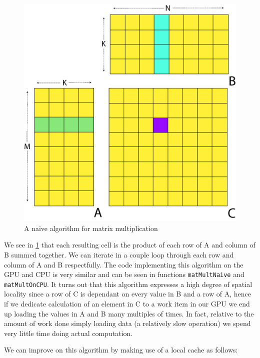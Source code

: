 \documentclass[conc-doc]{subfiles}
\begin{document}
\begin{figure}[H]
	\centerline{\includegraphics[width=\textwidth]{images/gpu-matmult1.png}}
	\caption{A naive algorithm for matrix multiplication}
	\label{fig:matmult1}
\end{figure}

We see in \ref{fig:matmult1} that each resulting cell is the product of each row of A and column of B summed together. We can iterate in a couple loop through each row and column of A and B respectfully. The code implementing this algorithm on the GPU and CPU is very similar and can be seen in functions \lstinline{matMultNaive} and \lstinline{matMultOnCPU}. It turns out that this algorithm expresses a high degree of spatial locality since a row of C is dependant on every value in B and a row of A, hence if we dedicate calculation of an element in C to a work item in our GPU we end up loading the values in A and B many multiples of times. In fact, relative to the amount of work done simply loading data (a relatively slow operation) we spend very little time doing actual computation.

We can improve on this algorithm by making use of a local cache as follows:
\end{document}
